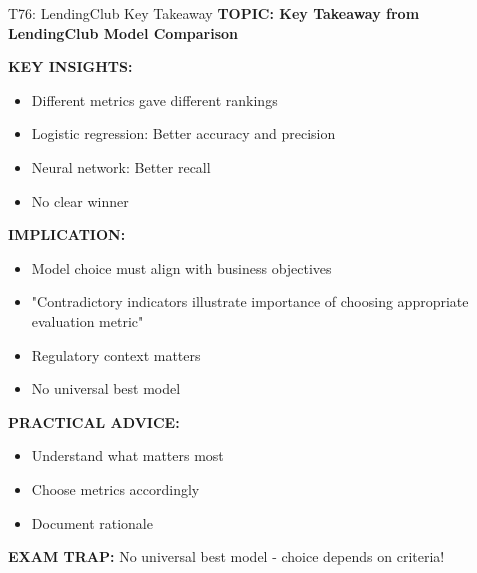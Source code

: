 \documentclass[8pt]{beamer}
\begin{document}
	\begin{frame}{T76: LendingClub Key Takeaway}
		\fontsize{6.5}{7.5}\selectfont
		\textbf{TOPIC: Key Takeaway from LendingClub Model Comparison}
		
		\vspace{0.1cm}
		\textbf{KEY INSIGHTS:}
		\begin{itemize}
			\item Different metrics gave different rankings
			\item Logistic regression: Better accuracy and precision
			\item Neural network: Better recall
			\item No clear winner
		\end{itemize}
		
		\vspace{0.1cm}
		\textbf{IMPLICATION:}
		\begin{itemize}
			\item Model choice must align with business objectives
			\item "Contradictory indicators illustrate importance of choosing appropriate evaluation metric"
			\item Regulatory context matters
			\item No universal best model
		\end{itemize}
		
		\vspace{0.1cm}
		\textbf{PRACTICAL ADVICE:}
		\begin{itemize}
			\item Understand what matters most
			\item Choose metrics accordingly
			\item Document rationale
		\end{itemize}
		
		\textcolor{myred}{\textbf{EXAM TRAP:}} No universal best model - \textcolor{myblue}{choice depends on criteria}!
	\end{frame}
	
\end{document}
